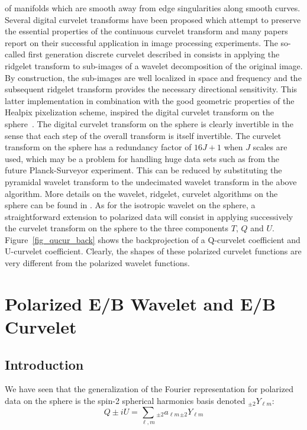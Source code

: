 of manifolds which are smooth away from edge singularities along smooth curves. Several digital curvelet transforms \cite{cur:donoho99,starck:sta01_3,cur:demanet06} 
have been proposed which attempt to preserve the essential properties of the continuous curvelet transform and many papers \cite{starck:sta04,felix2008,starck:sta04} 
report on their successful application in image processing experiments. The so-called first generation discrete curvelet described in \cite{cur:donoho99,starck:sta01_3} 
consists in applying the ridgelet transform to sub-images of a wavelet decomposition of the original image. By construction, the sub-images are 
well localized in space and frequency and the subsequent ridgelet transform provides the necessary directional sensitivity. This latter implementation 
in combination with the good geometric properties of the Healpix pixelization scheme, inspired the digital curvelet transform on the sphere~\cite{starck:sta05_2}. 
The digital curvelet transform on the sphere is clearly invertible in the sense that each step of the overall transform is itself invertible. 
The curvelet transform on the sphere has a redundancy factor of $16J + 1$ when $J$ scales are used, which may be a problem for handling huge data sets 
such as from the future Planck-Surveyor experiment. This can be reduced by substituting the pyramidal wavelet transform to the undecimated wavelet 
transform in the above algorithm. More details on the wavelet, ridgelet, curvelet algorithms on the sphere can be found in \cite{starck:sta05_2}. 
As for the isotropic wavelet on the sphere, a straightforward extension to polarized data will consist in applying successively the curvelet transform 
on the sphere to the three components $T$, $Q$ and $U$. Figure~\ref{fig_qucur_back} shows the backprojection of a Q-curvelet coefficient and 
U-curvelet coefficient. Clearly, the shapes of these polarized curvelet functions are very different from the polarized wavelet functions.%
\section{Polarized E/B Wavelet and E/B Curvelet}
\label{sec:pol_eb}

\subsection{Introduction}
We have seen that the generalization of the Fourier representation for polarized data on the sphere is the spin-2 spherical harmonics basis denoted $_{\pm 2}Y_{\ell m}$: 
\begin{equation} 
Q \pm i U  = \sum_{\ell, m}  { _{\pm 2}a_{\ell m}}   {_{\pm 2}Y_{\ell m} }
\end{equation} 
  
